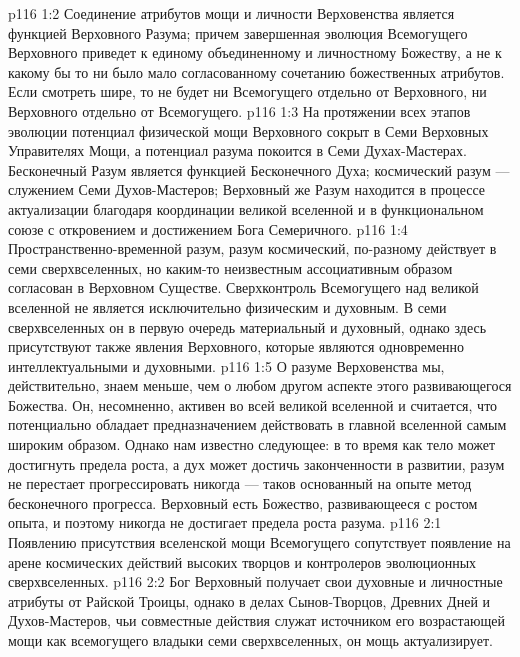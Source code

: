 \vs p116 1:2 Соединение атрибутов мощи и личности Верховенства является функцией Верховного Разума; причем завершенная эволюция Всемогущего Верховного приведет к единому объединенному и личностному Божеству, а не к какому бы то ни было мало согласованному сочетанию божественных атрибутов. Если смотреть шире, то не будет ни Всемогущего отдельно от Верховного, ни Верховного отдельно от Всемогущего.
\vs p116 1:3 На протяжении всех этапов эволюции потенциал физической мощи Верховного сокрыт в Семи Верховных Управителях Мощи, а потенциал разума покоится в Семи Духах\hyp{}Мастерах. Бесконечный Разум является функцией Бесконечного Духа; космический разум --- служением Семи Духов\hyp{}Мастеров; Верховный же Разум находится в процессе актуализации благодаря координации великой вселенной и в функциональном союзе с откровением и достижением Бога Семеричного.
\vs p116 1:4 \pc Пространственно\hyp{}временной разум, разум космический, по\hyp{}разному действует в семи сверхвселенных, но каким\hyp{}то неизвестным ассоциативным образом согласован в Верховном Существе. Сверхконтроль Всемогущего над великой вселенной не является исключительно физическим и духовным. В семи сверхвселенных он в первую очередь материальный и духовный, однако здесь присутствуют также явления Верховного, которые являются одновременно интеллектуальными и духовными.
\vs p116 1:5 О разуме Верховенства мы, действительно, знаем меньше, чем о любом другом аспекте этого развивающегося Божества. Он, несомненно, активен во всей великой вселенной и считается, что потенциально обладает предназначением действовать в главной вселенной самым широким образом. Однако нам известно следующее: в то время как тело может достигнуть предела роста, а дух может достичь законченности в развитии, разум не перестает прогрессировать никогда --- таков основанный на опыте метод бесконечного прогресса. Верховный есть Божество, развивающееся с ростом опыта, и поэтому никогда не достигает предела роста разума.
\vs p116 2:1 Появлению присутствия вселенской мощи Всемогущего сопутствует появление на арене космических действий высоких творцов и контролеров эволюционных сверхвселенных.
\vs p116 2:2 Бог Верховный получает свои духовные и личностные атрибуты от Райской Троицы, однако в делах Сынов\hyp{}Творцов, Древних Дней и Духов\hyp{}Мастеров, чьи совместные действия служат источником его возрастающей мощи как всемогущего владыки семи сверхвселенных, он мощь актуализирует.
